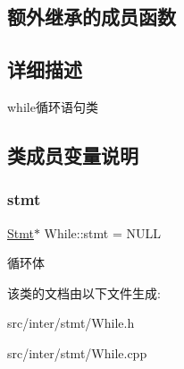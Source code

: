 \subsection*{额外继承的成员函数}


\subsection{详细描述}
while循环语句类 

\subsection{类成员变量说明}
\mbox{\label{class_while_a97dfbf50f27b969c5b765ecfb1ef4ac2}} 
\subsubsection{\texorpdfstring{stmt}{stmt}}
{\footnotesize\ttfamily \hyperlink{class_stmt}{Stmt}$\ast$ While\+::stmt = N\+U\+LL}

循环体 

该类的文档由以下文件生成\+:\begin{DoxyCompactItemize}
\item 
src/inter/stmt/While.\+h\item 
src/inter/stmt/While.\+cpp\end{DoxyCompactItemize}
